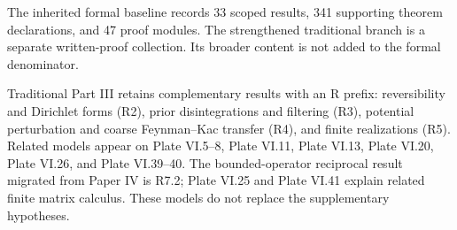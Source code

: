 The inherited formal baseline records 33 scoped results, 341 supporting theorem declarations, and 47 proof modules. The strengthened traditional branch is a separate written-proof collection. Its broader content is not added to the formal denominator.

Traditional Part III retains complementary results with an R prefix: reversibility and Dirichlet forms (R2), prior disintegrations and filtering (R3), potential perturbation and coarse Feynman--Kac transfer (R4), and finite realizations (R5). Related models appear on Plate VI.5--8, Plate VI.11, Plate VI.13, Plate VI.20, Plate VI.26, and Plate VI.39--40. The bounded-operator reciprocal result migrated from Paper IV is R7.2; Plate VI.25 and Plate VI.41 explain related finite matrix calculus. These models do not replace the supplementary hypotheses.
